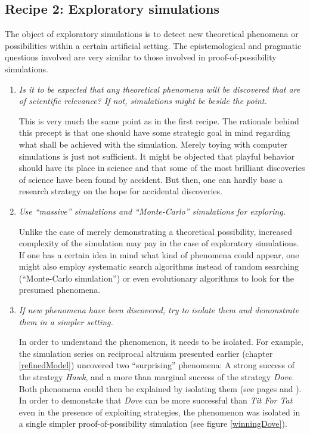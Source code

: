 \subsection{Recipe 2: Exploratory simulations}

The object of exploratory simulations is to detect new theoretical phenomena
or possibilities within a certain artificial setting. The epistemological and
pragmatic questions involved are very similar to those involved in
proof-of-possibility simulations.

\begin{enumerate}
\item {\em Is it to be expected that any theoretical phenomena will be
    discovered that are of scientific relevance? If not, simulations might be beside the point.}

  This is very much the same point as in the first recipe. The rationale
  behind this precept is that one should have some strategic goal in mind
  regarding what shall be achieved with the simulation. Merely toying with
  computer simulations is just not sufficient. It might be objected that
  playful behavior should have its place in science and that some of the most
  brilliant discoveries of science have been found by accident. 
  But then, one can hardly base a research
  strategy on the hope for accidental discoveries.

\item {\em Use ``massive'' simulations and ``Monte-Carlo'' simulations for
    exploring.}

  Unlike the case of merely demonstrating a theoretical possibility, increased
  complexity of the simulation may pay in the case of exploratory simulations.
  If one has a certain idea in mind what kind of phenomena could appear, one
  might also employ systematic search algorithms instead of random searching
(``Monte-Carlo simulation'') or even evolutionary algorithms to look for the
  presumed phenomena.

\item {\em If new phenomena have been discovered, try to isolate them and
    demonstrate them in a simpler setting.}

  In order to understand the phenomenon, it needs to be isolated. For example,
  the simulation series on reciprocal altruism presented earlier (chapter
  \ref{refinedModel}) uncovered two ``surprising'' phenomena: A strong success
  of the strategy {\em Hawk}, and a more than marginal success of the strategy
  {\em Dove}. Both phenomena could then be explained by isolating them (see
  pages \pageref{successHawk} and \pageref{slipstreamAltruism}). In order to demonstate
  that {\em Dove} can be more successful than {\em Tit For Tat} even in the
  presence of exploiting strategies, the phenomenon was isolated in a single
  simpler proof-of-possibility simulation (see figure \ref{winningDove}).


\end{enumerate}
